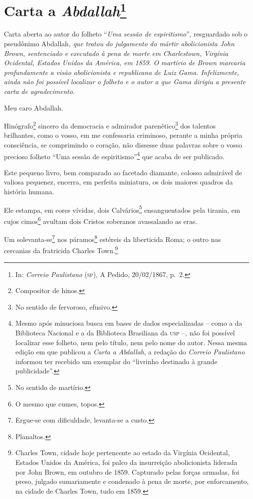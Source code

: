 \chapter{Carta a \emph{Abdallah}\footnote{In: \emph{Correio Paulistano}
  (\textsc{sp}), A Pedido, 20/02/1867, p.~2.}}

\begin{didascalia}
Carta aberta ao autor do folheto ``\emph{Uma sessão de espiritismo}'',
resguardado sob o pseudônimo Abdallah\emph{, que tratou do julgamento
do mártir abolicionista John Brown, sentenciado e executado à pena de
morte em Charlestown, Virgínia Ocidental, Estados Unidos da América, em
1859. O martírio de Brown marcaria profundamente a visão abolicionista e
republicana de Luiz Gama. Infelizmente, ainda não foi possível localizar
o folheto e o autor a que Gama dirigiu a presente carta de
agradecimento.}
\end{didascalia}




Meu caro Abdallah.

Hinógrafo\footnote{Compositor de hinos.} sincero da democracia e
admirador parenético\footnote{No sentido de fervoroso, efusivo.} dos
talentos brilhantes, como o vosso, em me confessaria criminoso, perante
a minha própria consciência, se comprimindo o coração, não dissesse duas
palavras sobre o vosso precioso folheto ``Uma sessão de
espiritismo''\footnote{Mesmo após minuciosa busca em bases de dados
  especializadas -- como a da Biblioteca Nacional e a da Biblioteca
  Brasiliana da \textsc{usp} --, não foi possível localizar esse folheto, nem
  pelo título, nem pelo nome do autor. Nessa mesma edição em que
  publicou a \emph{Carta a Abdallah}, a redação do \emph{Correio
  Paulistano} informou ter recebido um exemplar do ``livrinho destinado à
  grande publicidade''.} que acaba de ser publicado.

Este pequeno livro, bem comparado ao facetado diamante, colosso
admirável de valiosa pequenez, encerra, em perfeita miniatura, os dois
maiores quadros da história humana.

Ele estampa, em cores vívidas, dois Calvários\footnote{No sentido de
  martírio.} ensanguentados pela tirania, em cujos cimos\footnote{O
  mesmo que cumes, topos.} avultam dois Cristos soberanos avassalando as
eras.

Um solevanta-se\footnote{Ergue-se com dificuldade, levanta-se a custo.}
nos páramos\footnote{Planaltos.} estéreis da liberticida Roma; o outro
nas cercanias da fratricida Charles Town.\footnote{Charles Town, cidade
  hoje pertencente ao estado da Virgínia Ocidental, Estados Unidos da
  América, foi palco da insurreição abolicionista liderada por John
  Brown, em outubro de 1859. Capturado pelas forças armadas, foi preso,
  julgado sumariamente e condenado à pena de morte, por enforcamento, na
  cidade de Charles Town, tudo em 1859.}

